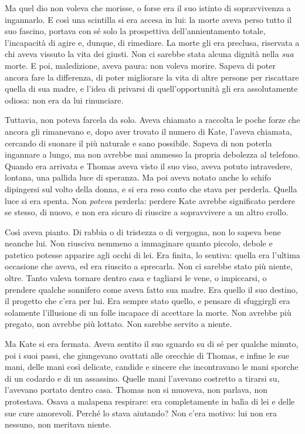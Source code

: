 \documentclass[a4paper,oneside,11pt]{memoir}
\begin{document}
Ma quel dio non voleva che morisse, o forse era il suo istinto di sopravvivenza
a ingannarlo. E così una scintilla si era accesa in lui: la morte aveva perso
tutto il suo fascino, portava con sé solo la prospettiva dell'annientamento
totale, l'incapacità di agire e, dunque, di rimediare. La morte gli era
preclusa, riservata a chi aveva vissuto la vita dei giusti. Non ci sarebbe stata
alcuna dignità nella \emph{sua} morte. E poi, maledizione, aveva paura: non
voleva morire. Sapeva di poter ancora fare la differenza, di poter migliorare la
vita di altre persone per riscattare quella di sua madre, e l'idea di privarsi
di quell'opportunità gli era assolutamente odiosa: non era da lui rinunciare.

Tuttavia, non poteva farcela da solo. Aveva chiamato a raccolta le poche forze
che ancora gli rimanevano e, dopo aver trovato il numero di Kate, l'aveva
chiamata, cercando di suonare il più naturale e sano possibile. Sapeva di non
poterla ingannare a lungo, ma non avrebbe mai ammesso la propria debolezza al
telefono. Quando era arrivata e Thomas aveva visto il suo viso, aveva potuto
intravedere, lontana, una pallida luce di speranza. Ma poi aveva notato anche lo
schifo dipingersi sul volto della donna, e si era reso conto che stava per
perderla. Quella luce si era spenta. Non \emph{poteva} perderla: perdere Kate
avrebbe significato perdere se stesso, di nuovo, e non era sicuro di riuscire a
sopravvivere a un altro crollo.

Così aveva pianto. Di rabbia o di tristezza o di vergogna, non lo sapeva bene
neanche lui. Non riusciva nemmeno a immaginare quanto piccolo, debole e patetico
potesse apparire agli occhi di lei. Era finita, lo sentiva: quella era l'ultima
occasione che aveva, ed era riuscito a sprecarla. Non ci sarebbe stato più
niente, oltre. Tanto valeva tornare dentro casa e tagliarsi le vene, o
impiccarsi, o prendere qualche sonnifero come aveva fatto sua madre. Era quello
il suo destino, il progetto che c'era per lui. Era sempre stato quello, e
pensare di sfuggirgli era solamente l'illusione di un folle incapace di
accettare la morte. Non avrebbe più pregato, non avrebbe più lottato. Non
sarebbe servito a niente.

Ma Kate si era fermata. Aveva sentito il suo sguardo su di sé per qualche
minuto, poi i suoi passi, che giungevano ovattati alle orecchie di Thomas, e
infine le sue mani, delle mani così delicate, candide e sincere che incontravano
le mani sporche di un codardo e di un assassino. Quelle mani l'avevano costretto
a tirarsi su, l'avevano portato dentro casa. Thomas non si muoveva, non parlava,
non protestava. Osava a malapena respirare: era completamente in balìa di lei e
delle sue cure amorevoli. Perché lo stava aiutando? Non c'era motivo: lui non
era nessuno, non meritava niente.
\end{document}
